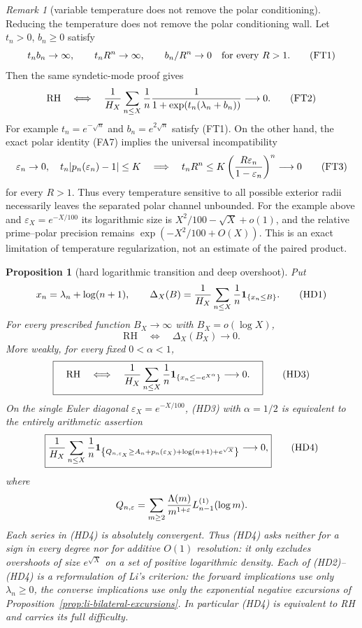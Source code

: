 \documentclass[11pt]{amsart}
\newtheorem{proposition}[theorem]{Proposition}
\theoremstyle{definition}
\theoremstyle{remark}
\newtheorem{remark}[theorem]{Remark}
\theoremstyle{definition}
\newcommand{\RH}{\mathrm{RH}}
\begin{document}
\begin{remark}[variable temperature does not remove the polar conditioning]
\label{rmk:variable-temperature-fermi-gate}
Reducing the temperature does not remove the polar conditioning wall.
Let $t_n>0$, $b_n\ge0$ satisfy
\[
 t_nb_n\to\infty,\qquad t_nR^n\to\infty,\qquad
 b_n/R^n\to0\quad\hbox{for every }R>1.                    \tag{FT1}
\]
Then the same syndetic-mode proof gives
\[
 \RH\quad\Longleftrightarrow\quad
 {1\over H_X}\sum_{n\le X}{1\over n}
 {1\over1+\exp(t_n(\lambda_n+b_n))}\longrightarrow0.     \tag{FT2}
\]
For example $t_n=e^{-\sqrt n}$ and $b_n=e^{2\sqrt n}$ satisfy (FT1).
On the other hand, the exact polar identity (FA7) implies the universal
incompatibility
\[
 \varepsilon_n\to0,\quad
 t_n|p_n(\varepsilon_n)-1|\le K
 \quad\Longrightarrow\quad
 t_nR^n\le K\left({R\varepsilon_n\over1-\varepsilon_n}\right)^n
 \longrightarrow0                                      \tag{FT3}
\]
for every $R>1$.  Thus every temperature sensitive to all possible
exterior radii necessarily leaves the separated polar channel unbounded.
For the example above and $\varepsilon_X=e^{-X/100}$ its logarithmic size
is $X^2/100-\sqrt X+o(1)$, and the relative prime--polar precision remains
$\exp(-X^2/100+O(X))$.  This is an exact limitation of temperature
regularization, not an estimate of the paired product.
\end{remark}

\begin{proposition}[hard logarithmic transition and deep overshoot]
\label{prop:li-hard-log-density}
Put
\[
 x_n=\lambda_n+\log(n+1),\qquad
 \Delta_X(B)={1\over H_X}\sum_{n\le X}{1\over n}
                 {\bf1}_{\{x_n\le B\}}.                 \tag{HD1}
\]
For every prescribed function $B_X\to\infty$ with $B_X=o(\log X)$,
\[
 \boxed{\quad\RH\quad\Longleftrightarrow\quad
              \Delta_X(B_X)\longrightarrow0.\quad}      \tag{HD2}
\]
More weakly, for every fixed $0<\alpha<1$,
\[
 \boxed{\quad\RH\quad\Longleftrightarrow\quad
 {1\over H_X}\sum_{n\le X}{1\over n}
 {\bf1}_{\{x_n\le-e^{X^\alpha}\}}\longrightarrow0.\quad} \tag{HD3}
\]
On the single Euler diagonal $\varepsilon_X=e^{-X/100}$, (HD3) with
$\alpha=1/2$ is equivalent to the entirely arithmetic assertion
\[
 \boxed{
 {1\over H_X}\sum_{n\le X}{1\over n}
 {\bf1}_{\left\{
 Q_{n,\varepsilon_X}\ge
 A_n+p_n(\varepsilon_X)+\log(n+1)+e^{\sqrt X}
 \right\}}\longrightarrow0,}                            \tag{HD4}
\]
where
\[
 Q_{n,\varepsilon}
 =\sum_{m\ge2}{\Lambda(m)\over m^{1+\varepsilon}}
 L_{n-1}^{(1)}(\log m).
\]
Each series in (HD4) is absolutely convergent.  Thus (HD4) asks neither
for a sign in every degree nor for additive $O(1)$ resolution: it only
excludes overshoots of size $e^{\sqrt X}$ on a set of positive logarithmic
density.  Each of (HD2)--(HD4) is a reformulation of Li's criterion: the
forward implications use only $\lambda_n\ge0$, the converse implications use
only the exponential negative excursions of
Proposition~\ref{prop:li-bilateral-excursions}.  In particular (HD4) is
equivalent to RH and carries its full difficulty.
\end{proposition}
\end{document}
